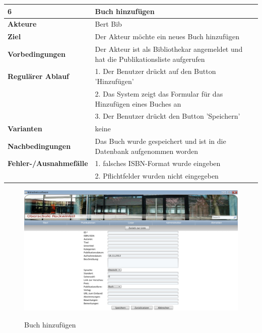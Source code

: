 \documentclass[fontsize=12pt,paper=a4,twoside]{scrartcl}
\begin{document}
\begin{table}[htbp]
\label{6}
\begin{tabular}{|l|p{10cm}|}
\hline 
\textbf{6} & \textbf{Buch hinzufügen} \\ \hline
\textbf{Akteure} & Bert Bib\\ \hline
\textbf{Ziel} & Der Akteur möchte ein neues Buch hinzufügen \\ \hline
\textbf{Vorbedingungen} & Der Akteur ist als Bibliothekar angemeldet und hat die Publikationsliste 
aufgerufen  \\ \hline
\textbf{Regulärer Ablauf} & 
1. Der Benutzer drückt auf den Button 'Hinzufügen' \\
&2. Das System zeigt das Formular für das Hinzufügen eines Buches an\\
&3. Der Benutzer drückt den Button 'Speichern'\\
\hline
\textbf{Varianten} & 
keine \\ \hline
\textbf{Nachbedingungen} & Das Buch wurde gespeichert und ist in die Datenbank aufgenommen 
worden\\ \hline
\textbf{Fehler-/Ausnahmefälle} & 1. falsches ISBN-Format wurde eingeben\\
&2. Pflichtfelder wurden nicht eingegeben\\
\hline
\end{tabular}
\end{table}

\begin{figure}[htbp]
\caption{Buch hinzufügen}
\includegraphics[width=1\textwidth]{ScreensWebsite/PublikationHinzufuegen.png}
\label{Publikationsliste}
\end{figure}
\end{document}
